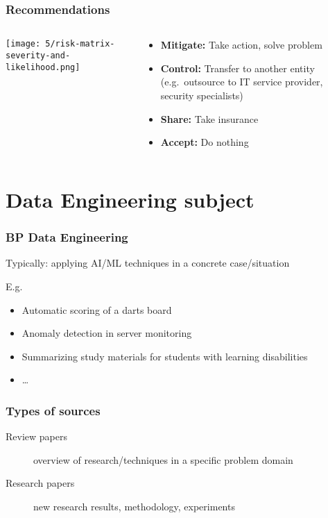 \documentclass[aspectratio=169]{beamer}
\begin{document}
\begin{frame}
  \frametitle{Recommendations}

  \begin{columns}
    \begin{column}{.5\textwidth}
      \texttt{[image: 5/risk-matrix-severity-and-likelihood.png]}
    \end{column}

    \begin{column}{.5\textwidth}
      \begin{itemize}
        \item \textbf{Mitigate:} Take action, solve problem
        \item \textbf{Control:} Transfer to another entity (e.g.\ outsource to IT service provider, security specialists)
        \item \textbf{Share:} Take insurance
        \item \textbf{Accept:} Do nothing
      \end{itemize}
    \end{column}
  \end{columns}
\end{frame}

\section{Data Engineering subject}

\begin{frame}
  \frametitle{BP Data Engineering}

  Typically: applying AI/ML techniques in a concrete case/situation

  E.g.

  \begin{itemize}
    \item Automatic scoring of a darts board
    \item Anomaly detection in server monitoring
    \item Summarizing study materials for students with learning disabilities
    \item \ldots
  \end{itemize}

\end{frame}

\begin{frame}
  \frametitle{Types of sources}

  \begin{description}
    \item[Review papers] overview of research/techniques in a specific problem domain
    \item[Research papers] new research results, methodology, experiments
  \end{description}

\end{frame}
\end{document}
